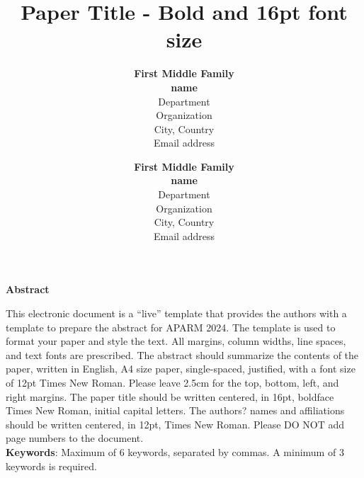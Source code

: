 \documentclass[a4paper,12pt]{article}
\title{\textbf{Paper Title - Bold and 16pt font size}}
\author{
\textbf{First Middle Family}\\
\textbf{name}\\
Department\\
Organization\\
City, Country\\
Email address
        \and
\textbf{First Middle Family}\\
\textbf{name}\\
Department\\
Organization\\
City, Country\\
Email address
}
\date{}
\begin{document}
\maketitle
\thispagestyle{fancy}
\renewcommand{\headrulewidth}{0pt} 
\fancyhead{}
\fancyfoot{}

\begin{center}
	\textbf{\large Abstract}
\end{center}
\noindent This electronic document is a ``live'' template that provides the authors with a template to prepare the abstract for APARM 2024. The template is used to format your paper and style the text. All margins, column widths, line spaces, and text fonts are prescribed. The abstract should summarize the contents of the paper, written in English, A4 size paper, single-spaced, justified, with a font size of 12pt Times New Roman. Please leave 2.5cm for the top, bottom, left, and right margins. The paper title should be written centered, in 16pt, boldface Times New Roman, initial capital letters. The authors? names and affiliations should be written centered, in 12pt, Times New Roman. Please DO NOT add page numbers to the document.\\

\noindent \textbf{Keywords}:	Maximum of 6 keywords, separated by commas. A minimum of 3 keywords is required.
\end{document}
